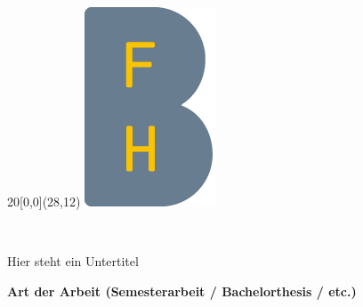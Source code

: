 %
%

\begin{titlepage}


\setlength{\unitlength}{1mm}
\begin{textblock}{20}[0,0](28,12)
	\includegraphics[scale=1.0]{bilder/BFH_Logo_B.png}
\end{textblock}
\color{black}

\begin{flushleft}

\vspace*{21mm}

\fontsize{26pt}{40pt}\selectfont 
\titel 				\\							%
\vspace{2mm}

\fontsize{16pt}{24pt}\selectfont\vspace{0.3em}
Hier steht ein Untertitel 			\\							%
\vspace{5mm}

\fontsize{10pt}{12pt}\selectfont
\textbf{Art der Arbeit (Semesterarbeit / Bachelorthesis / etc.)} \\									%
\vspace{7mm}


\end{flushleft}
\end{titlepage}
